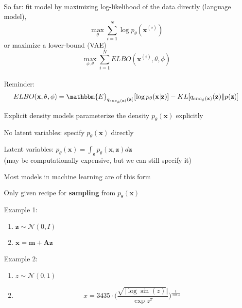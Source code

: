 \documentclass{beamer}
\let\tempone\itemize
\let\temptwo\enditemize
\renewenvironment{itemize}{\tempone\addtolength{\itemsep}{0.5\baselineskip}}{\temptwo}
\newcommand{\zvec}{\mathbf{z}}
\newcommand{\E}{\mathbbm{E}}
\newcommand{\xvec}{\mathbf{x}}
\begin{document}
\begin{frame}
\begin{center}
\end{center}
So far: fit model by maximizing log-likelihood of the data directly (language model),
\[ \max_\theta \sum_{i=1}^N \log p_\theta(\xvec^{(i)})\]
or maximize a lower-bound (VAE)
\[ \max_{\phi, \theta} \sum_{i=1}^N ELBO(\xvec^{(i)}, \theta, \phi)\]
\\
Reminder:
\[ ELBO(\xvec, \theta, \phi) = \E_{q_{enc_\phi(\xvec)}(\zvec)}[\log p_\theta(\xvec | \zvec)] - KL[q_{enc_\phi(\xvec)}(\zvec) \Vert p(\zvec)] \]
\end{frame}

\begin{frame}
\begin{center}
\end{center}
Explicit density models parameterize the density $p_\theta(\xvec)$ explicitly
\begin{itemize}
\item No latent variables: specify $p_\theta(\xvec)$ directly
\item Latent variables: $p_\theta(\xvec) = \int_\zvec p_\theta(\xvec, \zvec) d\zvec$ \\
(may be computationally expensive, but we can still specify it)
\item Most models in machine learning are of this form
\end{itemize}
\end{frame}


\begin{frame}
\begin{center}
\end{center}
\begin{itemize}
\item Only given recipe for \textbf{sampling} from $p_\theta(\xvec)$
\item Example 1:
\begin{enumerate}
\item $\zvec \sim \mathcal{N}(0, I)$
\item $\xvec = \mathbf{m} + \mathbf{A}\zvec $
\end{enumerate} \pause
\item Example 2:
\begin{enumerate}
\item $z \sim \mathcal{N}(0, 1)$
\item \[x =  3435\cdot \Big(\frac{\sqrt{|\log \sin (z)}|}{\exp z^{\pi}}\Big)^{\frac{1}{\cos z}} \]
\end{enumerate}
\end{itemize}
\end{frame}
\end{document}
